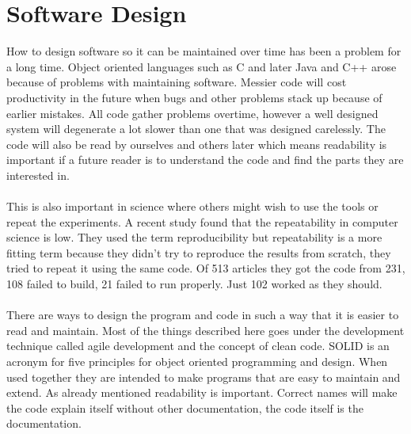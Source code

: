 \documentclass[10pt,a4paper]{report}
\begin{document}
\section{Software Design}
How to design software so it can be maintained over time has been a problem for a long time. Object oriented languages such as C and later Java and C++ arose because of problems with maintaining software. Messier code will cost productivity in the future when bugs and other problems stack up because of earlier mistakes. All code gather problems overtime, however a well designed system will degenerate a lot slower than one that was designed carelessly. The code will also be read by ourselves and others later which means readability is important if a future reader is to understand the code and find the parts they are interested in.\cite{cleancode2008, design_patterns}\\
\\
This is also important in science where others might wish to use the tools or repeat the experiments. A recent study\cite{comp_repro_2013} found that the repeatability in computer science is low. They used the term reproducibility but repeatability is a more fitting term because they didn't try to reproduce the results from scratch, they tried to repeat it using the same code. Of 513 articles they got the code from 231, 108 failed to build, 21 failed to run properly\cite{comp_repro_2013}. Just 102 worked as they should\cite{comp_repro_2013}.\\
\\
There are ways to design the program and code in such a way that it is easier to read and maintain. Most of the things described here goes under the development technique called agile development and the concept of clean code\cite{cleancode2008}. SOLID is an acronym for five principles for object oriented programming and design. When used together they are intended to make programs that are easy to maintain and extend. As already mentioned readability is important. Correct names will make the code explain itself without other documentation, the code itself is the documentation.
\end{document}
